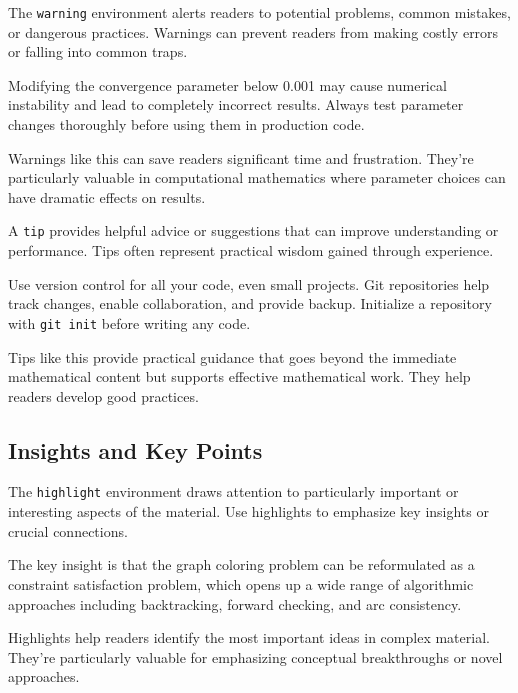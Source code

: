 \documentclass[9pt]{amsart}
\begin{document}
The \texttt{warning} environment alerts readers to potential problems, common
mistakes, or dangerous practices. Warnings can prevent readers from making
costly errors or falling into common traps.

\begin{warning}
	Modifying the convergence parameter below 0.001 may cause numerical instability and lead to completely incorrect results. Always test parameter changes thoroughly before using them in production code.
\end{warning}

Warnings like this can save readers significant time and frustration. They're
particularly valuable in computational mathematics where parameter choices can
have dramatic effects on results.

A \texttt{tip} provides helpful advice or suggestions that can improve
understanding or performance. Tips often represent practical wisdom gained
through experience.

\begin{tip}
	Use version control for all your code, even small projects. Git repositories help track changes, enable collaboration, and provide backup. Initialize a repository with \texttt{git init} before writing any code.
\end{tip}

Tips like this provide practical guidance that goes beyond the immediate
mathematical content but supports effective mathematical work. They help
readers develop good practices.

\subsection{Insights and Key Points}

The \texttt{highlight} environment draws attention to particularly important or
interesting aspects of the material. Use highlights to emphasize key insights
or crucial connections.

\begin{highlight}
	The key insight is that the graph coloring problem can be reformulated as a constraint satisfaction problem, which opens up a wide range of algorithmic approaches including backtracking, forward checking, and arc consistency.
\end{highlight}

Highlights help readers identify the most important ideas in complex material.
They're particularly valuable for emphasizing conceptual breakthroughs or novel
approaches.
\end{document}
